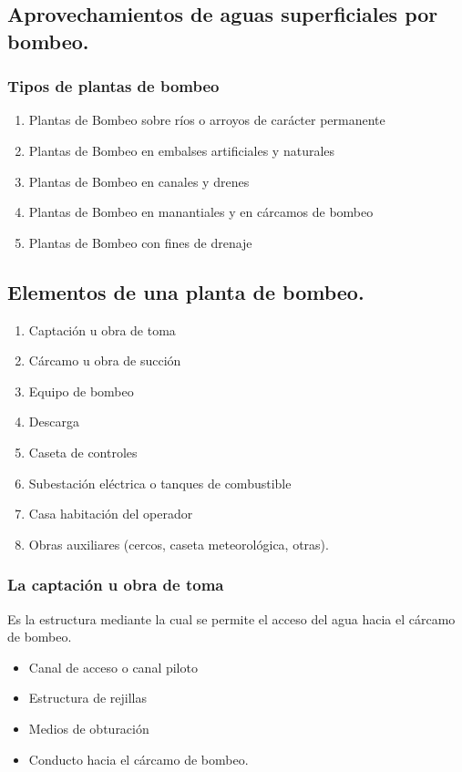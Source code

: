 \subsection{Aprovechamientos de aguas superficiales por bombeo.}

\subsubsection{Tipos de plantas de bombeo}
\begin{enumerate}
	\item Plantas de Bombeo sobre ríos o arroyos de carácter permanente
	\item Plantas de Bombeo en embalses artificiales y naturales
	\item Plantas de Bombeo en canales y drenes
	\item Plantas de Bombeo en manantiales y en cárcamos de bombeo
	\item Plantas de Bombeo con fines de drenaje
\end{enumerate}



\subsection{Elementos de una planta de bombeo.}

\begin{enumerate}
	\item Captación u obra de toma
	\item Cárcamo u obra de succión
	\item Equipo de bombeo
	\item Descarga
	\item Caseta de controles
	\item Subestación eléctrica o tanques de combustible
	\item Casa habitación del operador
	\item Obras auxiliares (cercos, caseta meteorológica, otras).
\end{enumerate}

\subsubsection{La captación u obra de toma}

Es la estructura mediante la cual se permite el acceso del agua hacia el cárcamo
de bombeo.

\begin{itemize}
	\item Canal de acceso o canal piloto
	\item Estructura de rejillas
	\item Medios de obturación
	\item Conducto hacia el cárcamo de bombeo.
\end{itemize}


